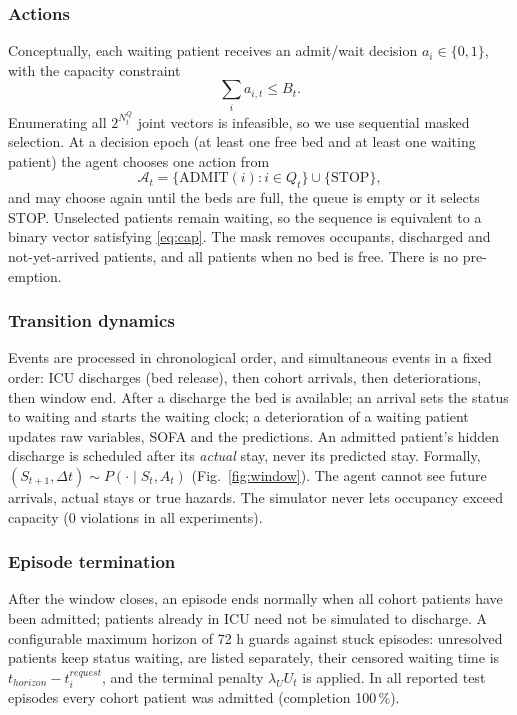 \documentclass{rlreport}
\begin{document}
\subsubsection{Actions}
Conceptually, each waiting patient receives an admit/wait decision $a_i\in\{0,1\}$, with the capacity constraint
\begin{equation}
  \sum_i a_{i,t}\le B_t.
  \label{eq:cap}
\end{equation}
Enumerating all $2^{N^Q_t}$ joint vectors is infeasible, so we use sequential masked selection. At a decision epoch (at least one free bed and at least one waiting patient) the agent chooses one action from
\begin{equation}
  \mathcal A_t=\{\mathrm{ADMIT}(i):i\in Q_t\}\cup\{\mathrm{STOP}\},
  \label{eq:actionset}
\end{equation}
and may choose again until the beds are full, the queue is empty or it selects STOP. Unselected patients remain waiting, so the sequence is equivalent to a binary vector satisfying \eqref{eq:cap}. The mask removes occupants, discharged and not-yet-arrived patients, and all patients when no bed is free. There is no pre-emption.

\subsubsection{Transition dynamics}
Events are processed in chronological order, and simultaneous events in a fixed order: ICU discharges (bed release), then cohort arrivals, then deteriorations, then window end. After a discharge the bed is available; an arrival sets the status to waiting and starts the waiting clock; a deterioration of a waiting patient updates raw variables, SOFA and the predictions. An admitted patient's hidden discharge is scheduled after its \emph{actual} stay, never its predicted stay. Formally, $(S_{t+1},\Delta t)\sim P(\cdot\mid S_t,A_t)$ (Fig.~\ref{fig:window}). The agent cannot see future arrivals, actual stays or true hazards. The simulator never lets occupancy exceed capacity (0 violations in all experiments).


\subsubsection{Episode termination}
After the window closes, an episode ends normally when all cohort patients have been admitted; patients already in ICU need not be simulated to discharge. A configurable maximum horizon of 72 h guards against stuck episodes: unresolved patients keep status waiting, are listed separately, their censored waiting time is $t_{horizon}-t_i^{request}$, and the terminal penalty $\lambda_UU_t$ is applied. In all reported test episodes every cohort patient was admitted (completion 100\,\%).
\end{document}
